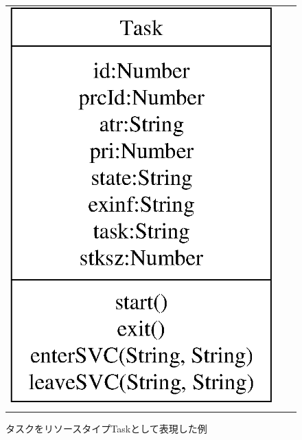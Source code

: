 \begin{figure}[p]
\begin{tabular}{ccc}
\begin{minipage}{0.35\hsize}
\begin{center}
\includegraphics[scale=0.5]{img/resourceTypeSampleByTask.eps}
\caption{タスクをリソースタイプTaskとして表現した例}
\label{fig:resourceTypeSampleByTask}
\end{center}
\end{minipage}
\begin{minipage}{0.25\hsize}
\mbox{}\\
\end{minipage}
\begin{minipage}{0.3\hsize}
\begin{center}

\end{center}
\end{minipage}
\end{tabular}
\end{figure}
